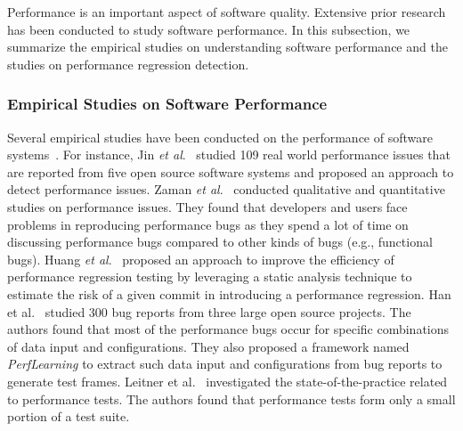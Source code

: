 Performance is an important aspect of software quality. Extensive prior research has been conducted to study software performance. In this subsection, we summarize the empirical studies on  %
understanding software performance and the studies on %
performance regression detection.

\subsubsection{Empirical Studies on Software Performance}
Several empirical studies have been conducted on the performance of software systems~\cite{ICSE2014:Huang,Jin:2012,MSR11:Zaman,MSR12:Zaman,DBLP:conf/kbse/HanYL18,Leitner2017ICPE}. For instance, Jin \emph{et al$.$}~\cite{Jin:2012} studied 109 real world performance issues that are reported from five open source software systems and %
proposed an approach to detect performance issues. Zaman \emph{et al$.$}~\cite{MSR11:Zaman,MSR12:Zaman} conducted qualitative and quantitative studies on performance issues. They found that developers and users face problems in reproducing performance bugs %
as they spend %
a lot of time on discussing performance bugs %
compared to other kinds of bugs (e.g., functional bugs). %
Huang \emph{et al$.$}~\cite{ICSE2014:Huang} %
proposed an approach to improve the efficiency of performance regression testing by leveraging a static analysis technique to estimate the risk of a given commit in introducing a performance regression. Han et al$.$~\cite{DBLP:conf/kbse/HanYL18} studied %
300 bug reports from three large open source projects. The authors found that most of the performance bugs occur for specific combinations of data input and configurations. They also proposed a framework named \emph{PerfLearning} to extract such data input and configurations from bug reports to generate test frames. Leitner et al$.$~\cite{Leitner2017ICPE} %
investigated the state-of-the-practice related to performance tests. The authors found that performance tests form only a small portion of a test suite.

